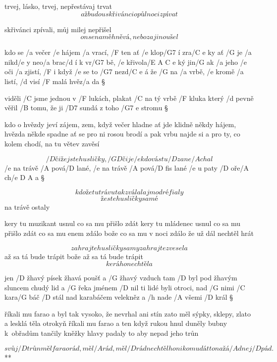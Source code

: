 trvej, lásko, trvej, nepřestávaj trvat
\[ až budou skřivánci o půlnoci zpívat \] \s

skřivánci zpívali, můj milej nepřišel
\[ on se na mě hněvá, nebo za jinou šel \]




kdo se /a večer /e hájem /a vrací, /F ten ať /e klop/G7 í zra/{C e} ky
ať /G je /a nikd/e y neo/a brac/d í k vr/G7 bě, /e křivola/{E A C e} ký
jin/G ak /a jeho /e oči /a zjistí, /F i když /e se to /G7 nezd/{C e} á
že /G na /a vrbě, /e kromě /a listí, /d visí /F malá hvěz/a da \S

viděli /C jsme jednou v /F lukách, plakat /C na tý vrbě /F kluka
který /d pevně věřil /B tomu, že ji /D7 sundá z toho /{G7 e} stromu \S

kdo o hvězdy jeví zájem, zem, když večer hladne
ať jde klidně někdy hájem, hvězda někde spadne
ať se pro ni rosou brodí a pak vrbu najde si
a pro ty, co kolem chodí, na tu větev zavěsí




\[ /D čiže jste husličky, /{G D} čije
/e kdo vás tu /D zane/A chal \]
/e na trávě /A pová/D lané, /e na trávě /A pová/{D fis} lané
/e u paty /D oře/A ch/{e D A} a \S

\[ kdože tu trávu tak zválal
aj modré fialy \]
\[ že ste husličky samé \]
na trávě ostaly \s

kery tu muzikant usnul
co sa mu přišlo zdát
kery tu mládenec usnul
co sa mu přišlo zdát
co sa mu enem zdálo
bože co sa mu v noci zdálo
že už dál nechtěl hrát \s

\[ zahrajte husličky samy
zahrajte zvesela \]
až sa tá bude trápit
bože až sa tá bude trápit
\[ kerá ho nechtěla \]




jen /D žhavý písek žhavá poušť a /G žhavý vzduch tam /D byl
pod žhavým sluncem chudý lid a /G řeka jménem /D nil
ti lidé byli otroci, nad /G nimi /C kara/G báč /D stál
nad karabáčem velekněz a /h nade /A všemi /D král \S

říkali mu farao a byl tak vysoko, že nevrhal ani stín
zato měl sýpky, sklepy, zlato a lesklá těla otrokyň \s
říkali mu farao a ten když rukou hnul duněly bubny k~obřadům
tančily kněžky hlavy padaly to aby nepad jeho trůn \s

\R \[ svůj /D trůn měl farao rád, měl /A rád, měl /D rád
   nechtěl ho nikomu dát to na žá/A dnej /D pád. \]**

